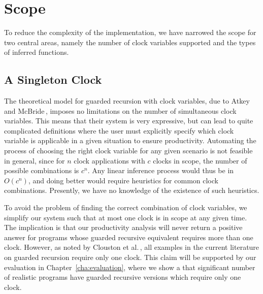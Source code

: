 


\section{Scope}
To reduce the complexity of the implementation, we have narrowed the scope for
two central areas, namely the number of clock variables supported and the types
of inferred functions.

\subsection{A Singleton Clock}
\label{sec:singleton-clock}

The theoretical model for guarded recursion with clock variables, due to Atkey
and McBride\,\citep{Atkey:2013}, imposes no limitations on the number of
simultaneous clock variables. This means that their system is very
expressive, but can lead to quite complicated definitions where the user must
explicitly specify which clock variable is applicable in a given situation to ensure
productivity. Automating the process of choosing the right clock variable for
any given scenario is not feasible in general, since for $n$ clock applications with $c$
clocks in scope, the number of possible combinations is $c^n$. Any linear
inference process would thus be in $O(c^n)$, and doing better would require
heuristics for common clock combinations. Presently, we have no knowledge of the
existence of such heuristics.

To avoid the problem of finding the correct combination of clock variables, we
simplify our system such that at most one clock is in scope at any given
time. The implication is that our productivity analysis will never return a
positive answer for programs whose guarded recursive equivalent requires more
than one clock. However, as noted by Clouston et
al.\,\citep{BirkedalL:guarded-lambda-conf}, all examples in the current literature
on guarded recursion require only one clock. This claim will be supported by our
evaluation in Chapter~\ref{cha:evaluation}, where we show a that significant number of
realistic programs have guarded recursive versions which require only one clock.

